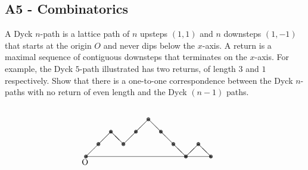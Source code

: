 \documentclass[11pt]{scrartcl}
\newcommand{\<}{\langle}
\renewcommand{\>}{\rangle}
\begin{document}
\subsection{A5 - Combinatorics}
A Dyck $n$-path is a lattice path of $n$ upsteps $(1, 1)$ and $n$ downsteps $(1, -1)$ that starts at the origin $O$ and never dips below the $x$-axis. A return is a maximal sequence of contiguous downsteps that terminates on the $x$-axis. For example, the Dyck $5$-path illustrated has two returns, of length $3$ and $1$ respectively. Show that there is a one-to-one correspondence between the Dyck $n$-paths with no return of even length and the Dyck $(n - 1)$ paths.

\[\begin{picture}(165,70)
\put(-5,0){O}
\put(0,10){\line(1,0){150}}
\put(0,10){\line(1,1){30}}
\put(30,40){\line(1,-1){15}}
\put(45,25){\line(1,1){30}}
\put(75,55){\line(1,-1){45}}
\put(120,10){\line(1,1){15}}
\put(135,25){\line(1,-1){15}}
\put(0,10){\circle{1}}\put(0,10){\circle{2}}\put(0,10){\circle{3}}\put(0,10){\circle{4}}
\put(15,25){\circle{1}}\put(15,25){\circle{2}}\put(15,25){\circle{3}}\put(15,25){\circle{4}}
\put(30,40){\circle{1}}\put(30,40){\circle{2}}\put(30,40){\circle{3}}\put(30,40){\circle{4}}
\put(45,25){\circle{1}}\put(45,25){\circle{2}}\put(45,25){\circle{3}}\put(45,25){\circle{4}}
\put(60,40){\circle{1}}\put(60,40){\circle{2}}\put(60,40){\circle{3}}\put(60,40){\circle{4}}
\put(75,55){\circle{1}}\put(75,55){\circle{2}}\put(75,55){\circle{3}}\put(75,55){\circle{4}}
\put(90,40){\circle{1}}\put(90,40){\circle{2}}\put(90,40){\circle{3}}\put(90,40){\circle{4}}
\put(105,25){\circle{1}}\put(105,25){\circle{2}}\put(105,25){\circle{3}}\put(105,25){\circle{4}}
\put(120,10){\circle{1}}\put(120,10){\circle{2}}\put(120,10){\circle{3}}\put(120,10){\circle{4}}
\put(135,25){\circle{1}}\put(135,25){\circle{2}}\put(135,25){\circle{3}}\put(135,25){\circle{4}}
\put(150,10){\circle{1}}\put(150,10){\circle{2}}\put(150,10){\circle{3}}\put(150,10){\circle{4}}
\end{picture}\]
\end{document}
